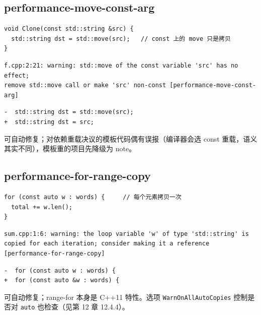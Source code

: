 \documentclass[12pt,a4paper,fontset=fandol]{ctexbook}
\newcommand{\cpp}[1]{C++#1}
\begin{document}
\subsection{performance-move-const-arg}\label{sec:ch13-s2b}
\begin{lstlisting}[style=cppstyle]
void Clone(const std::string &src) {
  std::string dst = std::move(src);   // const 上的 move 只是拷贝
}
\end{lstlisting}
\begin{lstlisting}[style=shellstyle]
f.cpp:2:21: warning: std::move of the const variable 'src' has no effect;
remove std::move call or make 'src' non-const [performance-move-const-arg]
\end{lstlisting}
\begin{lstlisting}[style=diffstyle]
-  std::string dst = std::move(src);
+  std::string dst = src;
\end{lstlisting}
可自动修复；对依赖重载决议的模板代码偶有误报（编译器会选 const 重载，语义其实不同），模板重的项目先降级为 note。
\subsection{performance-for-range-copy}\label{sec:ch13-s2c}
\begin{lstlisting}[style=cppstyle]
for (const auto w : words) {     // 每个元素拷贝一次
  total += w.len();
}
\end{lstlisting}
\begin{lstlisting}[style=shellstyle]
sum.cpp:1:6: warning: the loop variable 'w' of type 'std::string' is
copied for each iteration; consider making it a reference [performance-for-range-copy]
\end{lstlisting}
\begin{lstlisting}[style=diffstyle]
-  for (const auto w : words) {
+  for (const auto &w : words) {
\end{lstlisting}
可自动修复；range-for 本身是 \cpp{11} 特性。选项 \texttt{WarnOnAllAutoCopies} 控制是否对 \texttt{auto} 也检查（见第 12 章 12.4.4）。
\end{document}
